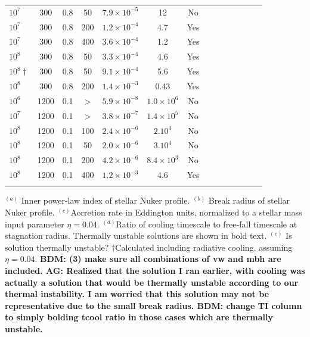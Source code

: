 \documentclass[usenatbib,fleqn]{mn2e}
\begin{document}
\begin{table}
\begin{threeparttable}
\begin{minipage}{18cm}
\begin{tabular}{lccccccccccccc}
$    10^{ 7 }$ & 300 & 0.8 & 50 & $ 7.9 \times 10^{ -5 }$ & 12 & No \\
$    10^{ 7 }$ & 300 & 0.8 & 200 & $ 1.2 \times 10^{ -4 }$ & 4.7 & Yes \\
$    10^{ 7 }$ & 300 & 0.8 & 400 & $ 3.6 \times 10^{ -4 }$ & 1.2 & Yes \\
$    10^{ 8 }$ & 300 & 0.8 & 50 & $ 3.3 \times 10^{ -4 }$ & 4.6 & Yes\\
$10^{8}\dagger$ & 300 & 0.8 & 50 & $ 9.1 \times 10^{ -4 }$ & 5.6 & Yes & \\
$    10^{ 8 }$ & 300 & 0.8 & 200 & $ 1.4 \times 10^{ -3 }$ & 0.43 & Yes \\
$    10^{ 6 }$ & 1200 & 0.1 & $>$ & $ 5.9 \times 10^{ -8 }$ & $ 1.0 \times 10^{ 6 }$ & No \\
$    10^{ 7 }$ & 1200 & 0.1 & $>$ & $ 3.8 \times 10^{ -7 }$ & $ 1.4 \times 10^{ 5 }$ & No \\
$    10^{ 8 }$ & 1200 & 0.1 & 100 & $ 2.4 \times 10^{ -6 }$ & $ 2. 10^{ 4 }$ & No \\
$    10^{ 8 }$ & 1200 & 0.1 & 50 & $ 2.0 \times 10^{ -6 }$ & $ 3. 10^{ 4 }$ & No \\
$    10^{ 8 }$ & 1200 & 0.1 & 200 & $ 4.2 \times 10^{ -6 }$ & $ 8.4 \times 10^{ 3 }$ & No \\
$    10^{ 8 }$ & 1200 & 0.1 & 400 & $ 1.2 \times 10^{ -3 }$ & 4.6 & Yes \\
\hline
\label{table:models}  
\end{tabular}
\begin{tablenotes}
\item $^{(a)}$ Inner power-law index of stellar Nuker profile.  $^{(b)}$
Break radius of stellar Nuker profile.  $^{(c)}$Accretion rate in
Eddington units, normalized to a stellar mass input parameter $\eta =
0.04$.  $^{(d)}$Ratio of cooling timescale to free-fall timescale at
stagnation radius.  Thermally unstable solutions are shown in bold text.  $^{(e)}$ Is solution thermally unstable?
$\dagger$Calculated including radiative cooling, assuming $\eta =
0.04$.  {\bf  BDM: (3) make sure all combinations of vw and mbh
  are included. AG: Realized that the solution I ran earlier, with
  cooling was actually a solution that would be thermally unstable
  according to our thermal instability. I am worried that this
  solution may not be representative due to the small break radius. BDM: change TI column to simply bolding tcool ratio in those cases which are thermally unstable.}
\end{tablenotes}
\end{minipage}
\end{threeparttable}

\end{table}
\end{document}
